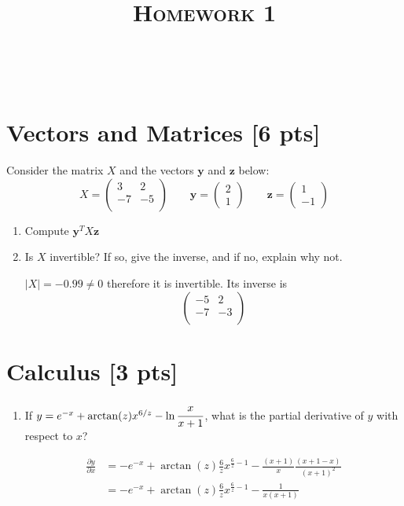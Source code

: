 \documentclass[a4paper]{article}
\title{\textsc{Homework 1}} %
\author{
	\red{Huzaifa Mustafa Unjhawala} \\
	\red{9081963267}\\
}
\date{}
\theoremstyle{definition}
\newcommand{\pd}[2]{\frac{\partial #1}{\partial #2}}
\newenvironment{soln}{
	\leavevmode\color{blue}\ignorespaces
}{}
\begin{document}
	
	\maketitle 
	
	
	\section{Vectors and Matrices [6 pts]}
	Consider the matrix $X$ and the vectors $\mathbf{y}$ and $\textbf{z}$ below:
	$$
	X = \begin{pmatrix}
		3 & 2 \\ -7 & -5 \\
	\end{pmatrix}
	\qquad \mathbf{y} = \begin{pmatrix}
		2 \\ 1
	\end{pmatrix} \qquad \mathbf{z} = \begin{pmatrix}
		1 \\ -1
	\end{pmatrix}
	$$
	\begin{enumerate}
		\item 	Compute $\mathbf{y}^{T} X \mathbf{z}$\\
			    \begin{soln} [0] \end{soln}
		\item 	Is $X$ invertible? If so, give the inverse, and if no, explain why not.\\
		        \begin{soln}  
					$|X| = -0.99 \neq 0$ therefore it is invertible. Its inverse is \\
					\[
						\begin{pmatrix}
							-5 & 2 \\ -7 & -3 \\
						\end{pmatrix}
					\]
				\end{soln}
	\end{enumerate}
	
	
	\section{Calculus [3 pts]}
	\begin{enumerate}
		\item If $y = e^{-x} + \arctan(z)x^{6/z} - \ln\cfrac{x}{x+1}$, what is the partial derivative of $y$ with respect to $x$?\\
		\begin{soln}
			\begin{align*}
				\pd{y}{x} &= -e^{-x} + \arctan(z) \frac{6}{z} x^{\frac{6}{z} - 1} - \frac{(x+1)}{x}\frac{(x+1-x)}{(x+1)^2} \\
						 &= -e^{-x} + \arctan(z) \frac{6}{z} x^{\frac{6}{z} - 1} - \frac{1}{x(x+1)}
			\end{align*}
		\end{soln}
	\end{enumerate}
	
\end{document}
